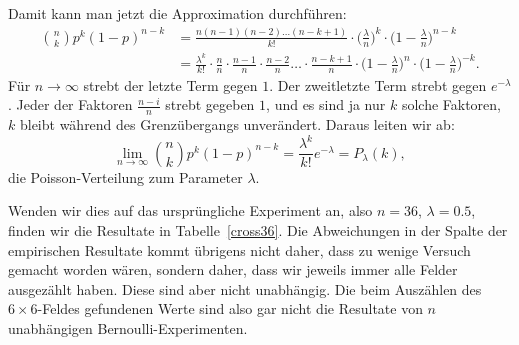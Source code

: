 Damit kann man jetzt die Approximation durchführen:
\begin{align*}
\binom{n}{k}p^k(1-p)^{n-k}
&=
\frac{n(n-1)(n-2)\dots(n-k+1)}{k!}\cdot \biggl(\frac{\lambda}n\biggr)^k\cdot \biggl(1-\frac{\lambda}n\biggr)^{n-k}\\
&=
\frac{\lambda^k}{k!}
\cdot\frac{n}{n}
\cdot\frac{n-1}{n}
\cdot\frac{n-2}{n}
\dots
\cdot\frac{n-k+1}{n}
\cdot
\biggl(1-\frac{\lambda}n\biggr)^n
\cdot
\biggl(1-\frac{\lambda}n\biggr)^{-k}.
\end{align*}
Für $n\to\infty$ strebt der letzte Term gegen $1$.
Der zweitletzte Term strebt gegen $e^{-\lambda}$.
Jeder der Faktoren $\frac{n-i}n$ strebt gegeben $1$, und es sind ja nur
$k$ solche Faktoren, $k$ bleibt während des Grenzübergangs unverändert.
Daraus leiten wir ab:
\[
\lim_{n\to\infty} 
\binom{n}{k}p^k(1-p)^{n-k}
=
\frac{\lambda^k}{k!}e^{-\lambda}=P_{\lambda}(k),
\]
die Poisson-Verteilung zum Parameter $\lambda$.

Wenden wir dies auf das ursprüngliche Experiment an, also $n=36$,
$\lambda=0.5$, finden wir die Resultate in Tabelle~\ref{cross36}. 
Die Abweichungen in der Spalte der empirischen Resultate kommt übrigens
nicht daher, dass zu wenige Versuch gemacht worden wären, sondern daher,
dass wir jeweils immer alle Felder ausgezählt haben.
Diese sind aber nicht
unabhängig.
Die beim Auszählen des $6\times 6$-Feldes gefundenen Werte
sind also gar nicht die Resultate von $n$ unabhängigen Bernoulli-Experimenten.
